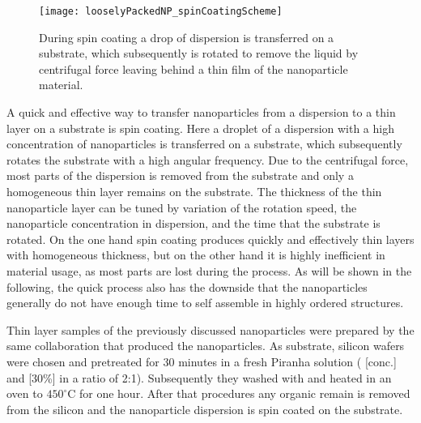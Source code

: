 \documentclass[\main/dresen_thesis.tex]{subfiles}
\begin{document}
  \begin{figure}[tb]
    \centering
    \texttt{[image: looselyPackedNP\_spinCoatingScheme]}
    \caption{\label{fig:looselyPackedNP:preparation:spinCoatingScheme}During spin coating a drop of dispersion is transferred on a substrate, which subsequently is rotated to remove the liquid by centrifugal force leaving behind a thin film of the nanoparticle material.}
  \end{figure}

  A quick and effective way to transfer nanoparticles from a dispersion to a thin layer on a substrate is spin coating.
  Here a droplet of a dispersion with a high concentration of nanoparticles is transferred on a substrate, which subsequently rotates the substrate with a high angular frequency.
  Due to the centrifugal force, most parts of the dispersion is removed from the substrate and only a homogeneous thin layer remains on the substrate.
  The thickness of the thin nanoparticle layer can be tuned by variation of the rotation speed, the nanoparticle concentration in dispersion, and the time that the substrate is rotated.
  On the one hand spin coating produces quickly and effectively thin layers with homogeneous thickness, but on the other hand it is highly inefficient in material usage, as most parts are lost during the process.
  As will be shown in the following, the quick process also has the downside that the nanoparticles generally do not have enough time to self assemble in highly ordered structures.

  Thin layer samples of the previously discussed nanoparticles were prepared by the same collaboration that produced the nanoparticles.
  As substrate, silicon wafers were chosen and pretreated for 30 minutes in a fresh Piranha solution ( [conc.] and  [30\%] in a ratio of 2:1). Subsequently they washed with  and heated in an oven to $450 ^\circ \mathrm{C}$ for one hour.
  After that procedures any organic remain is removed from the silicon and the nanoparticle dispersion is spin coated on the substrate.
\end{document}
